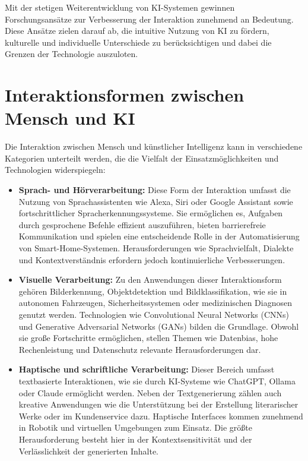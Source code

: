 \documentclass[a4paper,12pt]{article}
\begin{document}
Mit der stetigen Weiterentwicklung von KI-Systemen gewinnen Forschungsansätze zur Verbesserung der Interaktion zunehmend an Bedeutung. Diese Ansätze zielen darauf ab, die intuitive Nutzung von KI zu fördern, kulturelle und individuelle Unterschiede zu berücksichtigen und dabei die Grenzen der Technologie auszuloten.


\section{Interaktionsformen zwischen Mensch und KI}

Die Interaktion zwischen Mensch und künstlicher Intelligenz kann in verschiedene Kategorien unterteilt werden, die die Vielfalt der Einsatzmöglichkeiten und Technologien widerspiegeln:

\begin{itemize} \item \textbf{Sprach- und Hörverarbeitung:}
Diese Form der Interaktion umfasst die Nutzung von Sprachassistenten wie Alexa, Siri oder Google Assistant sowie fortschrittlicher Spracherkennungssysteme. Sie ermöglichen es, Aufgaben durch gesprochene Befehle effizient auszuführen, bieten barrierefreie Kommunikation und spielen eine entscheidende Rolle in der Automatisierung von Smart-Home-Systemen. Herausforderungen wie Sprachvielfalt, Dialekte und Kontextverständnis erfordern jedoch kontinuierliche Verbesserungen.
\item \textbf{Visuelle Verarbeitung:}  
Zu den Anwendungen dieser Interaktionsform gehören Bilderkennung, Objektdetektion und Bildklassifikation, wie sie in autonomen Fahrzeugen, Sicherheitssystemen oder medizinischen Diagnosen genutzt werden. Technologien wie Convolutional Neural Networks (CNNs) und Generative Adversarial Networks (GANs) bilden die Grundlage. Obwohl sie große Fortschritte ermöglichen, stellen Themen wie Datenbias, hohe Rechenleistung und Datenschutz relevante Herausforderungen dar.

\item \textbf{Haptische und schriftliche Verarbeitung:}  
Dieser Bereich umfasst textbasierte Interaktionen, wie sie durch KI-Systeme wie ChatGPT, Ollama oder Claude ermöglicht werden. Neben der Textgenerierung zählen auch kreative Anwendungen wie die Unterstützung bei der Erstellung literarischer Werke oder im Kundenservice dazu. Haptische Interfaces kommen zunehmend in Robotik und virtuellen Umgebungen zum Einsatz. Die größte Herausforderung besteht hier in der Kontextsensitivität und der Verlässlichkeit der generierten Inhalte.
\end{itemize}
\end{document}
